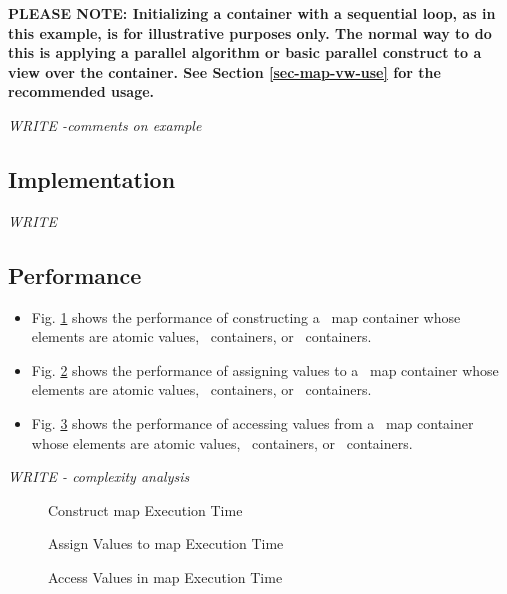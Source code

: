 \textbf{PLEASE NOTE: 
Initializing a container with a sequential loop, as in this example,
is for illustrative purposes only.
The normal way to do this is applying a parallel algorithm or 
basic parallel construct to a view over the container.  See Section
\ref{sec-map-vw-use}
for the recommended usage.
}

\vspace{0.4cm} \textit{WRITE -comments on example}

\subsection{Implementation} \label{sec-map-cont-impl}

\textit{WRITE}

\subsection{Performance} \label{sec-map-cont-perf}

\begin{itemize}
\item
Fig. \ref{fig:map-cont-constr-exper}
shows the performance of constructing a \stapl\ map container
whose elements are atomic values, \stl\ containers, or \stapl\ containers.
\item
Fig. \ref{fig:map-cont-assign-exper}
shows the performance of assigning values to a \stapl\ map container
whose elements are atomic values, \stl\ containers, or \stapl\ containers.
\item
Fig. \ref{fig:map-cont-access-exper}
shows the performance of accessing values from a \stapl\ map container
whose elements are atomic values, \stl\ containers, or \stapl\ containers.
\end{itemize}

\textit{WRITE - complexity analysis}

\begin{figure}[p]
\caption{Construct map Execution Time}
\label{fig:map-cont-constr-exper}
\end{figure}

\begin{figure}[p]
\caption{Assign Values to map Execution Time}
\label{fig:map-cont-assign-exper}
\end{figure}

\begin{figure}[p]
\caption{Access Values in map Execution Time}
\label{fig:map-cont-access-exper}
\end{figure}

